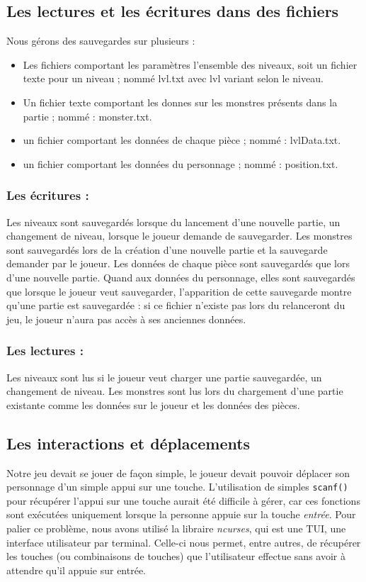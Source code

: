 \documentclass[11pt]{report}
\begin{document}
		\subsection{Les lectures et les écritures dans des fichiers}
		
		Nous gérons des sauvegardes sur plusieurs :
		\begin{itemize}
			\item Les fichiers comportant les paramètres l'ensemble des niveaux, soit un fichier texte pour un niveau ; nommé lvl.txt avec lvl variant selon le niveau.
			\item Un fichier texte comportant les donnes sur les monstres présents dans la partie ; nommé : monster.txt.
			\item un fichier comportant les données de chaque pièce ; nommé : lvlData.txt.
			\item un fichier comportant les données du personnage ; nommé : position.txt.
		\end{itemize} 
		\subsubsection{Les écritures :}
		Les niveaux sont sauvegardés lorsque du lancement d'une nouvelle partie, un changement de niveau, lorsque le joueur demande de sauvegarder. Les monstres sont sauvegardés lors de la création d'une nouvelle partie et la sauvegarde demander par le joueur. Les données de chaque pièce sont sauvegardés que lors d'une nouvelle partie. Quand aux données du personnage, elles sont sauvegardés que lorsque le joueur veut sauvegarder, l'apparition de cette sauvegarde montre qu'une partie est sauvegardée : si ce fichier n'existe pas lors du relanceront du jeu, le joueur n'aura pas accès à ses anciennes données.

		\subsubsection{Les lectures :}
		Les niveaux sont lus si le joueur veut charger une partie sauvegardée, un changement de niveau. Les monstres sont lus lors du chargement d'une partie existante comme les données sur le joueur et les données des pièces.

		\subsection{Les interactions et déplacements}\label{ncurses}

		
			Notre jeu devait se jouer de façon simple, le joueur devait pouvoir déplacer son personnage d'un simple appui sur une touche. L'utilisation de simples \texttt{scanf()} pour récupérer l'appui sur une touche aurait été difficile à gérer, car ces fonctions sont exécutées uniquement lorsque la personne appuie sur la touche \textit{entrée}. Pour palier ce problème, nous avons utilisé la libraire \emph{ncurses}, qui est une \textsc{TUI}, une interface utilisateur par terminal. Celle-ci nous permet, entre autres, de récupérer les touches (ou combinaisons de touches) que l'utilisateur effectue sans avoir à attendre qu'il appuie sur entrée.
			
\end{document}
